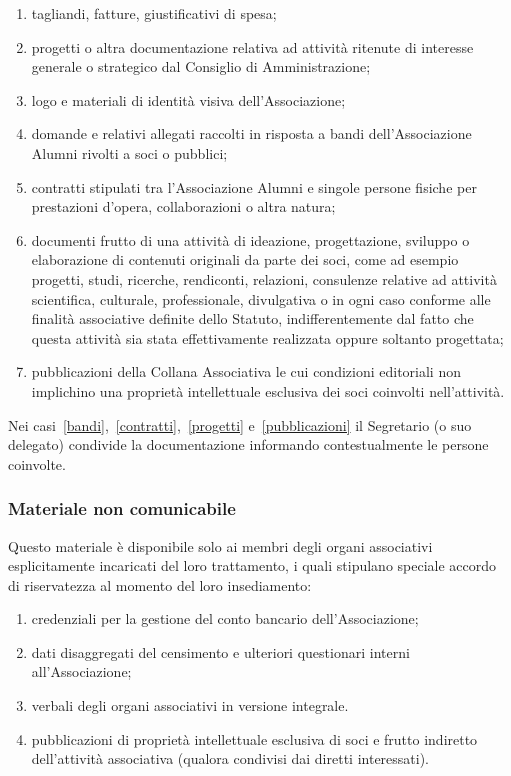 \begin{enumerate}
    \item tagliandi, fatture, giustificativi di spesa;
    \item progetti o altra documentazione relativa ad attività ritenute di
        interesse generale o strategico dal Consiglio di Amministrazione; 
    \item logo e materiali di identità visiva dell’Associazione; 
    \item\label{bandi} domande e relativi allegati raccolti in risposta a
        bandi dell’Associazione Alumni rivolti a soci o pubblici;
    \item\label{contratti} contratti stipulati tra l’Associazione Alumni e
        singole persone fisiche per prestazioni d’opera, collaborazioni o
        altra natura; 
    \item\label{progetti} documenti frutto di una attività di ideazione,
        progettazione, sviluppo o elaborazione di contenuti originali da
        parte dei soci, come ad esempio progetti, studi, ricerche,
        rendiconti, relazioni, consulenze relative ad attività scientifica,
        culturale, professionale, divulgativa o in ogni caso conforme alle
        finalità associative definite dello Statuto, indifferentemente dal
        fatto che questa attività sia stata effettivamente realizzata oppure
        soltanto progettata; 
    \item\label{pubblicazioni} pubblicazioni della Collana Associativa le
        cui condizioni editoriali non implichino una proprietà intellettuale
        esclusiva dei soci coinvolti nell’attività.
\end{enumerate}
Nei casi~\ref{bandi},~\ref{contratti},~\ref{progetti} e~\ref{pubblicazioni} il
Segretario (o suo delegato) condivide la documentazione informando
contestualmente le persone coinvolte. 

\subsubsection{Materiale non comunicabile}\label{materiale-non-comunicabile}

Questo materiale è disponibile solo ai membri degli organi associativi
esplicitamente incaricati del loro trattamento, i quali stipulano speciale
accordo di riservatezza al momento del loro insediamento:

\begin{enumerate}
    \item credenziali per la gestione del conto bancario dell’Associazione;
    \item dati disaggregati del censimento e ulteriori questionari interni
        all’Associazione;
    \item verbali degli organi associativi in versione integrale.
    \item pubblicazioni di proprietà intellettuale esclusiva di soci e
        frutto indiretto dell’attività associativa (qualora condivisi dai
        diretti interessati).
\end{enumerate}

